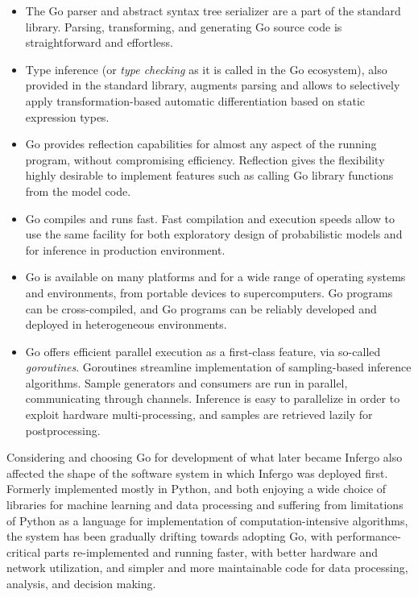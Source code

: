 \documentclass[sigplan,review,10pt,anonymous]{acmart}
\begin{document}
\begin{sloppypar}
\begin{itemize}
	\item The Go parser and abstract syntax tree serializer are
		a part of the standard library. Parsing, transforming,
		and generating Go source code is straightforward and
		effortless.
	\item Type inference (or \textit{type checking} as it is
		called in the Go ecosystem), also provided in the
		standard library, augments parsing and allows to
		selectively apply transformation-based automatic
		differentiation  based on static expression types. 
	\item Go provides reflection capabilities for almost any aspect
		of the running program, without compromising efficiency.
		Reflection gives the flexibility highly desirable to
		implement features such as calling Go library
		functions from the model code.
	\item Go compiles and runs fast. Fast compilation and
		execution speeds allow to use the same facility for both
		exploratory design of probabilistic models and for
		inference in production environment.
	\item Go is available on many platforms and for a wide range
		of operating systems and environments, from portable
		devices to supercomputers. Go programs can be
		cross-compiled, and Go programs can be reliably
		developed and deployed in heterogeneous environments.
	\item Go offers efficient parallel execution as a
		first-class feature, via so-called \textit{goroutines}.
		Goroutines streamline implementation of sampling-based
		inference algorithms. Sample generators and consumers
		are run in parallel, communicating through channels. 
		Inference is easy to parallelize in order to exploit
		hardware multi-processing, and samples are retrieved
		lazily for postprocessing. 
\end{itemize}

Considering and choosing Go for development of what later became
Infergo also affected the shape of the software system in which
Infergo was deployed first. Formerly implemented mostly in
Python, and both enjoying a wide choice of libraries for machine
learning and data processing and suffering from limitations of
Python as a language for implementation of computation-intensive
algorithms, the system has been gradually drifting towards
adopting Go, with performance-critical parts re-implemented and
running faster, with better hardware and network utilization,
and simpler and more maintainable code for data processing,
analysis, and decision making.


\end{sloppypar}
\end{document}
